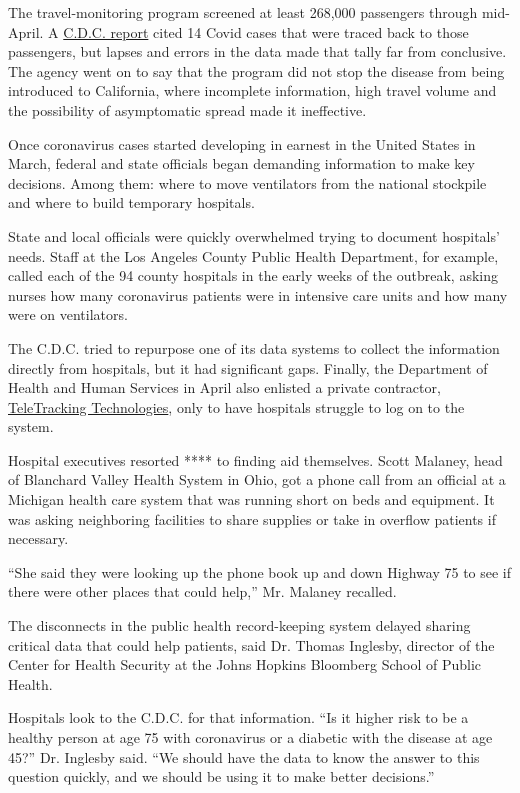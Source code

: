 The travel-monitoring program screened at least 268,000 passengers
through mid-April. A
\href{https://www.cdc.gov/mmwr/volumes/69/wr/mm6919e4.htm}{C.D.C.
report} cited 14 Covid cases that were traced back to those passengers,
but lapses and errors in the data made that tally far from conclusive.
The agency went on to say that the program did not stop the disease from
being introduced to California, where incomplete information, high
travel volume and the possibility of asymptomatic spread made it
ineffective.

Once coronavirus cases started developing in earnest in the United
States in March, federal and state officials began demanding information
to make key decisions. Among them: where to move ventilators from the
national stockpile and where to build temporary hospitals.

State and local officials were quickly overwhelmed trying to document
hospitals' needs. Staff at the Los Angeles County Public Health
Department, for example, called each of the 94 county hospitals in the
early weeks of the outbreak, asking nurses how many coronavirus patients
were in intensive care units and how many were on ventilators.

The C.D.C. tried to repurpose one of its data systems to collect the
information directly from hospitals, but it had significant gaps.
Finally, the Department of Health and Human Services in April also
enlisted a private contractor,
\href{https://www.nytimes3xbfgragh.onion/2020/08/14/us/politics/teletracking-technologies-coronavirus-senators.html}{TeleTracking
Technologies}, only to have hospitals struggle to log on to the system.

Hospital executives resorted **** to finding aid themselves. Scott
Malaney, head of Blanchard Valley Health System in Ohio, got a phone
call from an official at a Michigan health care system that was running
short on beds and equipment. It was asking neighboring facilities to
share supplies or take in overflow patients if necessary.

``She said they were looking up the phone book up and down Highway 75 to
see if there were other places that could help,'' Mr. Malaney recalled.

The disconnects in the public health record-keeping system delayed
sharing critical data that could help patients, said Dr. Thomas
Inglesby, director of the Center for Health Security at the Johns
Hopkins Bloomberg School of Public Health.

Hospitals look to the C.D.C. for that information. ``Is it higher risk
to be a healthy person at age 75 with coronavirus or a diabetic with the
disease at age 45?'' Dr. Inglesby said. ``We should have the data to
know the answer to this question quickly, and we should be using it to
make better decisions.''

